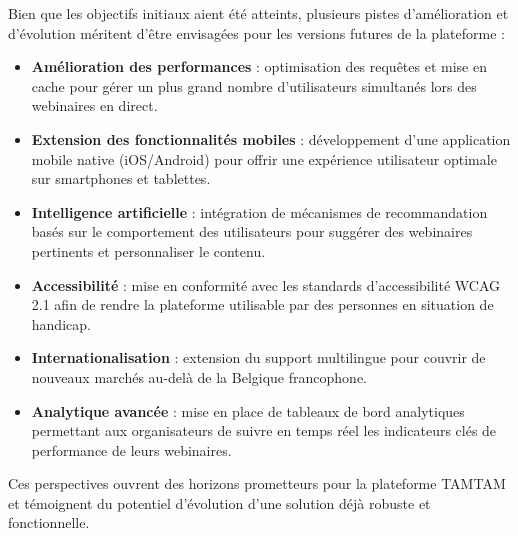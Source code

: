 Bien que les objectifs initiaux aient été atteints, plusieurs pistes d'amélioration et d'évolution méritent d'être envisagées pour les versions futures de la plateforme :

\begin{itemize}
    \item \textbf{Amélioration des performances} : optimisation des requêtes et mise en cache pour gérer un plus grand nombre d'utilisateurs simultanés lors des webinaires en direct.

    \item \textbf{Extension des fonctionnalités mobiles} : développement d'une application mobile native (iOS/Android) pour offrir une expérience utilisateur optimale sur smartphones et tablettes.

    \item \textbf{Intelligence artificielle} : intégration de mécanismes de recommandation basés sur le comportement des utilisateurs pour suggérer des webinaires pertinents et personnaliser le contenu.

    \item \textbf{Accessibilité} : mise en conformité avec les standards d'accessibilité WCAG 2.1 afin de rendre la plateforme utilisable par des personnes en situation de handicap.

    \item \textbf{Internationalisation} : extension du support multilingue pour couvrir de nouveaux marchés au-delà de la Belgique francophone.

    \item \textbf{Analytique avancée} : mise en place de tableaux de bord analytiques permettant aux organisateurs de suivre en temps réel les indicateurs clés de performance de leurs webinaires.
\end{itemize}

Ces perspectives ouvrent des horizons prometteurs pour la plateforme TAMTAM et témoignent du potentiel d'évolution d'une solution déjà robuste et fonctionnelle.
